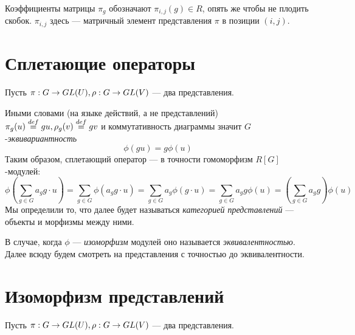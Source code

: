 Коэффициенты матрицы $\pi_g$ обозначают $\pi_{i,j}(g) \in R$, опять же чтобы не плодить скобок.
$\pi_{i,j}$ здесь --- матричный элемент представления $\pi$ в позиции $(i,j)$.


\section{Сплетающие операторы}
Пусть $\pi:G \rightarrow GL(U), \rho: G \rightarrow GL(V)$ --- два представления.

Иными словами (на языке действий, а не представлений) $\pi_g(u) \overset{def}{=} gu, \rho_g(v) \overset{def}{=} gv$ и коммутативность диаграммы значит $G$-\textit{эквивариантность}
\[\phi(gu) = g\phi(u)\]
Таким образом, сплетающий оператор --- в точности гомоморфизм $R[G]$-модулей:
\[\phi\left(\sum\limits_{g \in G}a_g g\cdot  u\right) = \sum\limits_{g \in G}\phi(a_g g \cdot u) = \sum\limits_{g \in G}a_g\phi(g \cdot u) = \sum\limits_{g \in G}a_g g \phi(u) = \left(\sum\limits_{g \in G}a_g g\right) \phi(u)\]
Мы определили то, что далее будет называться \textit{категорией представлений} --- объекты и морфизмы между ними.

В случае, когда $\phi$ --- \textit{изоморфизм} модулей оно называется \textit{эквивалентностью}.
Далее всюду будем смотреть на представления с точностью до эквивалентности.


\section{Изоморфизм представлений}
Пусть $\pi: G \rightarrow GL(U), \rho: G \rightarrow GL(V)$ --- два представления.

